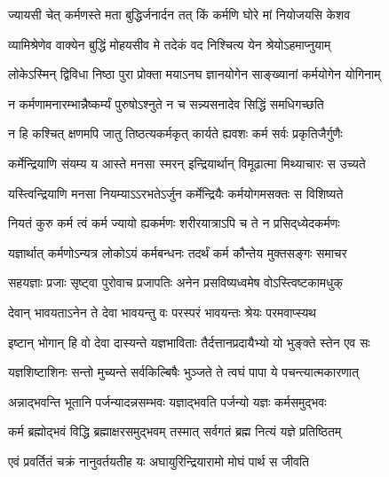 
\twolineshloka
{ज्यायसी चेत् कर्मणस्ते मता बुद्धिर्जनार्दन}
{तत् किं कर्मणि घोरे मां नियोजयसि केशव}%

\twolineshloka
{व्यामिश्रेणेव वाक्येन बुद्धिं मोहयसीव मे}
{तदेकं वद निश्चित्य येन श्रेयोऽहमाप्नुयाम्}%

\twolineshloka
{लोकेऽस्मिन् द्विविधा निष्ठा पुरा प्रोक्ता मयाऽनघ}
{ज्ञानयोगेन साङ्ख्यानां कर्मयोगेन योगिनाम्}%

\twolineshloka
{न कर्मणामनारम्भान्नैष्कर्म्यं पुरुषोऽश्नुते}
{न च सन्न्यसनादेव सिद्धिं समधिगच्छति}%

\twolineshloka
{न हि कश्चित् क्षणमपि जातु तिष्ठत्यकर्मकृत्}
{कार्यते ह्यवशः कर्म सर्वः प्रकृतिजैर्गुणैः}%

\twolineshloka
{कर्मेन्द्रियाणि संयम्य य आस्ते मनसा स्मरन्}
{इन्द्रियार्थान् विमूढात्मा मिथ्याचारः स उच्यते}%

\twolineshloka
{यस्त्विन्द्रियाणि मनसा नियम्याऽऽरभतेऽर्जुन}
{कर्मेन्द्रियैः कर्मयोगमसक्तः स विशिष्यते}%

\twolineshloka
{नियतं कुरु कर्म त्वं कर्म ज्यायो ह्यकर्मणः}
{शरीरयात्राऽपि च ते न प्रसिद्‌ध्येदकर्मणः}%

\twolineshloka
{यज्ञार्थात् कर्मणोऽन्यत्र लोकोऽयं कर्मबन्धनः}
{तदर्थं कर्म कौन्तेय मुक्तसङ्गः समाचर}%

\twolineshloka
{सहयज्ञाः प्रजाः सृष्ट्वा पुरोवाच प्रजापतिः}
{अनेन प्रसविष्यध्वमेष वोऽस्त्विष्टकामधुक्}%

\twolineshloka
{देवान् भावयताऽनेन ते देवा भावयन्तु वः}
{परस्परं भावयन्तः श्रेयः परमवाप्स्यथ}%

\twolineshloka
{इष्टान् भोगान् हि वो देवा दास्यन्ते यज्ञभाविताः}
{तैर्दत्तानप्रदायैभ्यो यो भुङ्क्ते स्तेन एव सः}%

\twolineshloka
{यज्ञशिष्टाशिनः सन्तो मुच्यन्ते सर्वकिल्बिषैः}
{भुञ्जते ते त्वघं पापा ये पचन्त्यात्मकारणात्}%

\twolineshloka
{अन्नाद्भवन्ति भूतानि पर्जन्यादन्नसम्भवः}
{यज्ञाद्भवति पर्जन्यो यज्ञः कर्मसमुद्भवः}%

\twolineshloka
{कर्म ब्रह्मोद्भवं विद्धि ब्रह्माक्षरसमुद्भवम्}
{तस्मात् सर्वगतं ब्रह्म नित्यं यज्ञे प्रतिष्ठितम्}%

\twolineshloka
{एवं प्रवर्तितं चक्रं नानुवर्तयतीह यः}
{अघायुरिन्द्रियारामो मोघं पार्थ स जीवति}%

